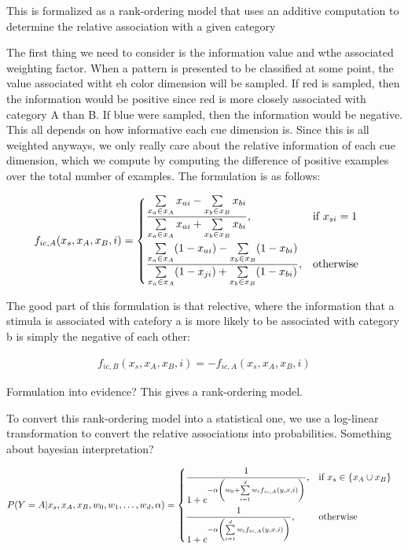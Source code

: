 \documentclass{article}
\begin{document}
This is formalized as a rank-ordering model that uses an additive computation to determine the relative association with a given category

The first thing we need to consider is the information value and wthe associated weighting factor. When a pattern is presented to be classified at some point, the value associated witht eh color dimension will be sampled. If red is sampled, then the information would be positive since red is more closely associated with category A than B. If blue were sampled, then the information would be negative. This all depends on how informative each cue dimension is. Since this is all weighted anyways, we only really care about the relative information of each cue dimension, which we compute by computing the difference of positive examples over the total number of examples. The formulation is as follows:

\begin{align}
    f_{ic,A}(x_s, x_A, x_B, i) &= 
        \begin{dcases}
            \frac{\sum\limits_{x_a \in x_A} x_{ai} - \sum\limits_{x_b \in x_B} x_{bi}} {\sum\limits_{x_a \in x_A} x_{ai} + \sum\limits_{x_b \in x_B} x_{bi}}, & \text{if } x_{si} = 1 \\
            \frac{\sum\limits_{x_a \in x_A} (1-x_{ai}) - \sum\limits_{x_b \in x_B} (1-x_{bi})} {\sum\limits_{x_a \in x_A} (1-x_{ji}) + \sum\limits_{x_b \in x_B} (1-x_{bi})}, & \text{otherwise } 
        \end{dcases}
\end{align}

The good part of this formulation is that relective, where the information that a stimula is associated with catefory a is more likely to be associated with category b is simply the negative of each other:

\begin{align}
f_{ic,B}(x_s, x_A, x_B, i) = -f_{ic,A}(x_s, x_A, x_B, i)
\end{align}

Formulation into evidence? This gives a rank-ordering model.

To convert this rank-ordering model into a statistical one, we use a log-linear transformation to convert the relative associations into probabilities. Something about bayesian interpretation?

\begin{align}
    P(Y=A| x_s, x_A, x_B, w_0, w_1, \dots, w_d, \alpha) &= 
        \begin{dcases}
            \frac{1}{1 + e^{-\alpha \left(w_0 + \sum \limits_{i=1}^d w_i f_{ic,A}(y, x, i)\right)}}, & \text{if } x_s \in \{x_A \cup x_B\}\\
            \frac{1}{1 + e^{-\alpha \left(\sum \limits_{i=1}^d w_i f_{ic,A}(y, x, i)\right)}}, & \text{otherwise }
        \end{dcases}
\end{align}
\end{document}
